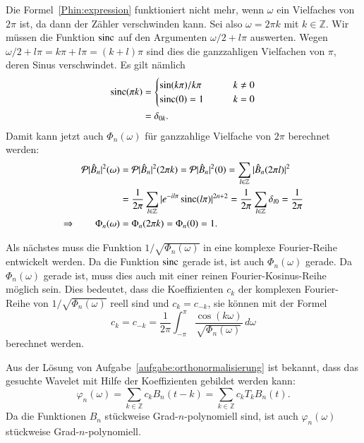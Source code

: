 Die Formel~\eqref{Phin:expression} funktioniert nicht mehr, wenn $\omega$
ein Vielfaches von $2\pi$ ist, da dann der Zähler verschwinden kann.
Sei also $\omega = 2\pi k$ mit $k\in\mathbb Z$.
Wir müssen die Funktion $\sinc$ auf den Argumenten
$\omega/2+l\pi$ auswerten.
Wegen $\omega/2 + l\pi=k\pi + l\pi = (k+l)\pi$ sind dies die ganzzahligen
Vielfachen von $\pi$, deren Sinus verschwindet.
Es gilt nämlich
\begin{align*}
\sinc (\pi k)
&=
\begin{cases}
\sin(k\pi)/k\pi&\qquad k\ne 0\\
\sinc(0)=1&\qquad k=0
\end{cases}
\\
&=
\delta_{0k}.
\end{align*}
Damit kann jetzt auch $\Phi_n(\omega)$ für ganzzahlige Vielfache von $2\pi$ 
berechnet werden:
\begin{align*}
\mathcal{P}|\hat{B}_n|^2(\omega)
&=
\mathcal{P}|\hat{B}_n|^2(2\pi k)
=
\mathcal{P}|\hat{B}_n|^2(0)
=
\sum_{l\in\mathbb Z} |\hat{B}_n(2\pi l)|^2
\\
&=
\frac1{2\pi}
\sum_{l\in\mathbb Z} |e^{-il\pi}\sinc(l\pi)|^{2n+2}
=
\frac1{2\pi}
\sum_{l\in\mathbb Z} \delta_{l0}
=
\frac1{2\pi}
\\
\Rightarrow\qquad
\Phi_n(\omega)
&=
\Phi_n(2\pi k)
=
\Phi_n(0)=1.
\end{align*}

Als nächstes muss die Funktion $1/\sqrt{\Phi_n(\omega)}$ in eine komplexe
Fourier-Reihe entwickelt werden.
Da die Funktion $\sinc$ gerade ist, ist auch $\Phi_n(\omega)$ gerade.
Da $\Phi_n(\omega)$ gerade ist, muss dies auch mit einer reinen
Fourier-Kosinus-Reihe möglich sein.
Dies bedeutet, dass die Koeffizienten $c_k$ der komplexen Fourier-Reihe
von $1/\sqrt{\Phi_n(\omega)}$ reell sind und $c_k=c_{-k}$,
sie können mit 
der Formel
\begin{equation}
c_k = c_{-k}
=
\frac{1}{2\pi}
\int_{-\pi}^{\pi}
\frac{\cos(k\omega)}{\sqrt{\Phi_n(\omega)}}
\,d\omega
\label{sqrtPhincoef}
\end{equation}
berechnet werden.

Aus der Lösung von Aufgabe~\ref{aufgabe:orthonormalisierung} ist bekannt,
dass das gesuchte Wavelet mit Hilfe der Koeffizienten gebildet werden 
kann:
\[
\varphi_n(\omega)
=
\sum_{k\in\mathbb Z}
c_k B_n(t-k)
=
\sum_{k\in\mathbb Z}
c_k T_kB_n(t).
\]
Da die Funktionen $B_n$ stückweise Grad-$n$-polynomiell sind, ist auch
$\varphi_n(\omega)$ stückweise Grad-$n$-polynomiell.

